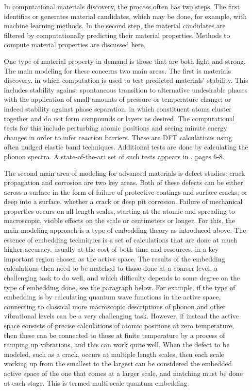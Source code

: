 In computational materials discovery, the process often has two steps.  The first identifies or generates material candidates, which may be done, for example, with machine learning methods.  In the second step, the material candidates are filtered by computationally predicting their material properties.  Methods to compute material properties are discussed here.

One type of material property in demand is those that are both light and strong. The main modeling for these concerns two main areas. The first is materials discovery, in which computation is used to test predicted materials' stability. This includes stability against spontaneous transition to alternative undesirable phases with the application of small amounts of pressure or temperature change; or indeed stability against phase separation, in which constituent atoms cluster together and do not form compounds or layers as desired. The computational tests for this include perturbing atomic positions and seeing minute energy changes in order to infer reaction barriers. These are DFT calculations using often nudged elastic band techniques. Additional tests are done by calculating the phonon spectra. A state-of-the-art set of such tests appears in \cite{long2023two}, pages 6-8.

   The second main area of modeling for advanced materials is defect studies: crack propagation and corrosion are two key areas. Both of these defects can be either across a surface in the form of failure of protective coatings and surface cracks; or deep into a surface, whether a crack or deep pit corrosion. Failure of mechanical properties occurs on all length scales, starting at the atomic and spreading to macroscopic, visible effects on the scale or centimeters or longer. For this, the main modeling approach is a type of embedding theory as introduced above. The essence of embedding techniques is a set of calculations that are done at much higher accuracy, usually at the cost of both time and resources, in a key important region chosen as the active space. The results of the embedding calculations then need to be matched to those done at a coarser level, a challenging task to do well, and which difficulty depends to some degree on the type of embedding done, see the paragraph below. For example, if the type of embedding is by calculating quantum wave functions in the active space, connecting to classical more macroscopic descriptions of phonon and other vibrational levels can be a very challenging task. However, if instead the active space consists of precise calculations of atomic positions at zero temperature, then these can be connected to those at finite temperature by a process of ramping up vibrations, and this can work quite well. When the defect to be modeled, such as a crack, occurs at multiple length scales, then each scale working up from the smallest to the largest can be considered the embedded active space of the one that comes at a larger scale, and matching must be done at each stage. This is termed multi-scale quantum embedding. 
   
